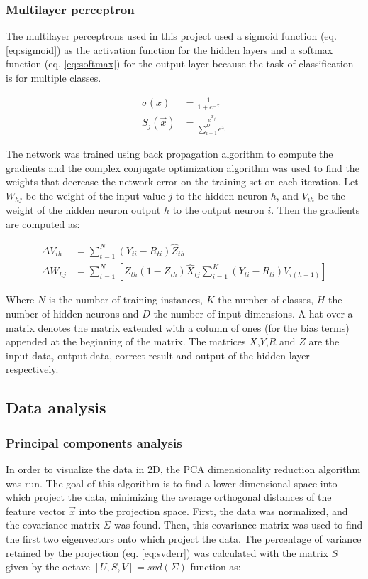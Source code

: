 \documentclass{IEEEtran}
\begin{document}
\subsubsection{Multilayer perceptron}
The multilayer perceptrons used in this project used a sigmoid function (eq. \ref{eq:sigmoid}) as the
activation function for the hidden layers and a softmax function (eq. \ref{eq:softmax}) for the output layer
because the task of classification is for multiple classes.

\begin{align}
\sigma(x) &= \frac{1}{1+e^{-x}} \label{eq:sigmoid} \\ 
S_j(\vec{x}) &= \frac{e^{x_j}}{\sum_{i=1}^D{e^{x_i}}} \label{eq:softmax}
\end{align}

The network was trained using back propagation algorithm to compute the gradients and the complex conjugate
optimization algorithm was used to find the weights that decrease the network error on the training set on
each iteration. Let $W_{hj}$ be the weight of the input value $j$ to the hidden neuron $h$, and $V_{ih}$ be
the weight of the hidden neuron output $h$ to the output neuron $i$. Then the gradients are computed as:

\begin{align}
\Delta V_{ih} &= \sum_{t=1}^{N}{(Y_{ti} - R_{ti}) \hat{Z}_{th}} \label{eq:gradV} \\ 
\Delta W_{hj} &= \sum_{t=1}^{N}{ 
    \left[ Z_{th}(1 - Z_{th})\hat{X}_{tj} \sum_{i=1}^{K}{ (Y_{ti} - R_{ti})V_{i(h+1)} } \right]
}  \label{eq:gradW}
\end{align}

Where $N$ is the number of training instances, $K$ the number of classes, $H$ the number of hidden neurons 
and $D$ the number of input dimensions. A hat over a matrix denotes the matrix extended with a column of
ones (for the bias terms) appended at the beginning of the matrix. The matrices $X$,$Y$,$R$ and $Z$ are
the input data, output data, correct result and output of the hidden layer respectively.

\subsection{Data analysis}

\subsubsection{Principal components analysis}
In order to visualize the data in 2D, the PCA dimensionality reduction algorithm was run.
The goal of this algorithm is to find a lower dimensional space into which project the data, minimizing
the average orthogonal distances of the feature vector $\vec{x}$ into the projection space. First, the data
was normalized, and the covariance matrix $\Sigma$ was found. Then, this covariance matrix was used to find the
first two eigenvectors onto which project the data. The percentage of variance retained by the projection 
(eq. \ref{eq:svderr}) was calculated with the matrix $S$ given by the octave $[U,S,V] = svd(\Sigma)$ function as:
\end{document}
